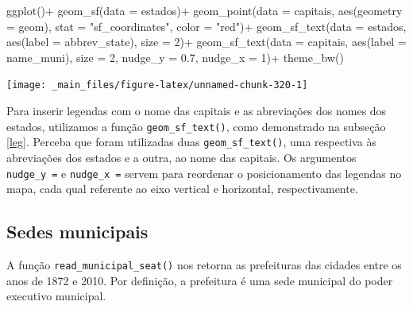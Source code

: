 \documentclass[
  brazilian,
]{book}
\newenvironment{Shaded}{\begin{snugshade}}{\end{snugshade}}
\newcommand{\AttributeTok}[1]{\textcolor[rgb]{0.77,0.63,0.00}{#1}}
\newcommand{\DecValTok}[1]{\textcolor[rgb]{0.00,0.00,0.81}{#1}}
\newcommand{\FloatTok}[1]{\textcolor[rgb]{0.00,0.00,0.81}{#1}}
\newcommand{\FunctionTok}[1]{\textcolor[rgb]{0.00,0.00,0.00}{#1}}
\newcommand{\NormalTok}[1]{#1}
\newcommand{\SpecialCharTok}[1]{\textcolor[rgb]{0.00,0.00,0.00}{#1}}
\newcommand{\StringTok}[1]{\textcolor[rgb]{0.31,0.60,0.02}{#1}}
\begin{document}
\begin{Shaded}
\begin{Highlighting}[]
\FunctionTok{ggplot}\NormalTok{()}\SpecialCharTok{+}
  \FunctionTok{geom\_sf}\NormalTok{(}\AttributeTok{data =}\NormalTok{ estados)}\SpecialCharTok{+}
  \FunctionTok{geom\_point}\NormalTok{(}\AttributeTok{data =}\NormalTok{ capitais,}
             \FunctionTok{aes}\NormalTok{(}\AttributeTok{geometry =}\NormalTok{ geom),}
             \AttributeTok{stat =} \StringTok{"sf\_coordinates"}\NormalTok{,}
             \AttributeTok{color =} \StringTok{"red"}\NormalTok{)}\SpecialCharTok{+}
  \FunctionTok{geom\_sf\_text}\NormalTok{(}\AttributeTok{data =}\NormalTok{ estados,}
               \FunctionTok{aes}\NormalTok{(}\AttributeTok{label =}\NormalTok{ abbrev\_state),}
               \AttributeTok{size =} \DecValTok{2}\NormalTok{)}\SpecialCharTok{+}
  \FunctionTok{geom\_sf\_text}\NormalTok{(}\AttributeTok{data =}\NormalTok{ capitais,}
               \FunctionTok{aes}\NormalTok{(}\AttributeTok{label =}\NormalTok{ name\_muni),}
               \AttributeTok{size =} \DecValTok{2}\NormalTok{,}
               \AttributeTok{nudge\_y =} \FloatTok{0.7}\NormalTok{,}
               \AttributeTok{nudge\_x =} \DecValTok{1}\NormalTok{)}\SpecialCharTok{+}
  \FunctionTok{theme\_bw}\NormalTok{()}
\end{Highlighting}
\end{Shaded}

\begin{center}\texttt{[image: \_main\_files/figure-latex/unnamed-chunk-320-1]} \end{center}

Para inserir legendas com o nome das capitais e as abreviações dos nomes dos estados, utilizamos a função \texttt{geom\_sf\_text()}, como demonstrado na subseção \ref{leg}. Perceba que foram utilizadas duas \texttt{geom\_sf\_text()}, uma respectiva às abreviações dos estados e a outra, ao nome das capitais. Os argumentos \texttt{nudge\_y\ =} e \texttt{nudge\_x\ =} servem para reordenar o posicionamento das legendas no mapa, cada qual referente ao eixo vertical e horizontal, respectivamente.

\hypertarget{sedes-municipais}{%
\subsection{Sedes municipais}\label{sedes-municipais}}

A função \texttt{read\_municipal\_seat()} nos retorna as prefeituras das cidades entre os anos de 1872 e 2010. Por definição, a prefeitura é uma sede municipal do poder executivo municipal.
\end{document}

